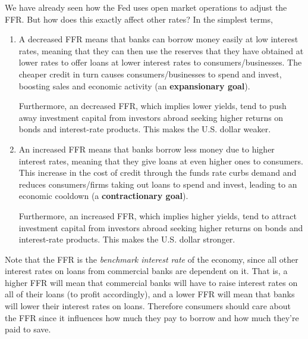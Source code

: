 \documentclass{article}
\begin{document}
    We have already seen how the Fed uses open market operations to adjust the FFR. But how does this exactly affect other rates? In the simplest terms, 
    \begin{enumerate}
      \item A decreased FFR means that banks can borrow money easily at low interest rates, meaning that they can then use the reserves that they have obtained at lower rates to offer loans at lower interest rates to consumers/businesses. The cheaper credit in turn causes consumers/businesses to spend and invest, boosting sales and economic activity (an \textbf{expansionary goal}). 
      
      Furthermore, an decreased FFR, which implies lower yields, tend to push away investment capital from investors abroad seeking higher returns on bonds and interest-rate products. This makes the U.S. dollar weaker. 
      
      \item An increased FFR means that banks borrow less money due to higher interest rates, meaning that they give loans at even higher ones to consumers. This increase in the cost of credit through the funds rate curbs demand and reduces consumers/firms taking out loans to spend and invest, leading to an economic cooldown (a \textbf{contractionary goal}). 
      
      Furthermore, an increased FFR, which implies higher yields, tend to attract investment capital from investors abroad seeking higher returns on bonds and interest-rate products. This makes the U.S. dollar stronger. 
    \end{enumerate}

    Note that the FFR is the \textit{benchmark interest rate} of the economy, since all other interest rates on loans from commercial banks are dependent on it. That is, a higher FFR will mean that commercial banks will have to raise interest rates on all of their loans (to profit accordingly), and a lower FFR will mean that banks will lower their interest rates on loans. Therefore consumers should care about the FFR since it influences how much they pay to borrow and how much they're paid to save. 
\end{document}
